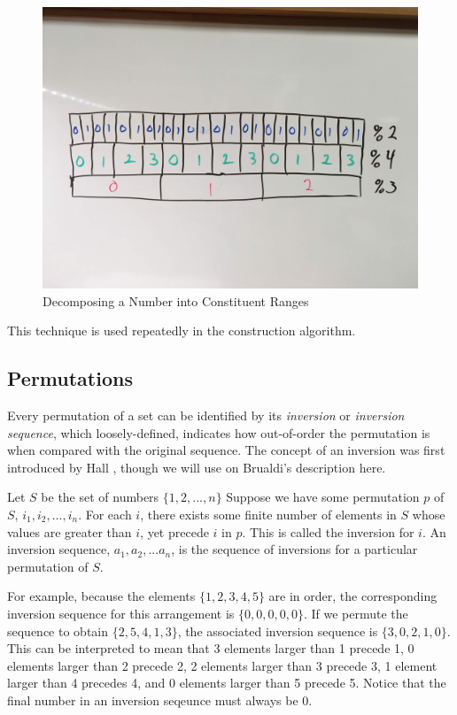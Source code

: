 \begin{figure}
\centering
\centerline{\includegraphics[origin=c,width=12cm]{../figures/interval-breakdown.jpg}}
\caption{Decomposing a Number into Constituent Ranges}
\label{fig:interval_breakdown}
\end{figure}

This technique is used repeatedly in the construction algorithm.

\subsection{Permutations}

Every permutation of a set can be identified by its \textit{inversion} or \textit{inversion sequence}, which loosely-defined, indicates how out-of-order the permutation is when compared with the original sequence. The concept of an inversion was first introduced by Hall \cite{hall_automorphisms_1962}, though we will use on Brualdi's description \cite{brualdi_introductory_2010} here.

Let $S$ be the set of numbers $\{1, 2, ..., n\}$ Suppose we have some permutation $p$ of $S$, $i_1, i_2, ..., i_n$. For each $i$, there exists some finite number of elements in $S$ whose values are greater than $i$, yet precede $i$ in $p$. This is called the inversion for $i$. An inversion sequence, $a_1, a_2, ... a_n$, is the sequence of inversions for a particular permutation of $S$.

For example, because the elements $\{1, 2, 3, 4, 5\}$ are in order, the corresponding inversion sequence for this arrangement is $\{0, 0, 0, 0, 0\}$. If we permute the sequence to obtain $\{2, 5, 4, 1, 3\}$, the associated inversion sequence is $\{3, 0, 2, 1, 0\}$. This can be interpreted to mean that 3 elements larger than 1 precede 1, 0 elements larger than 2 precede 2, 2 elements larger than 3 precede 3, 1 element larger than 4 precedes 4, and 0 elements larger than 5 precede 5. Notice that the final number in an inversion seqeunce must always be 0.


